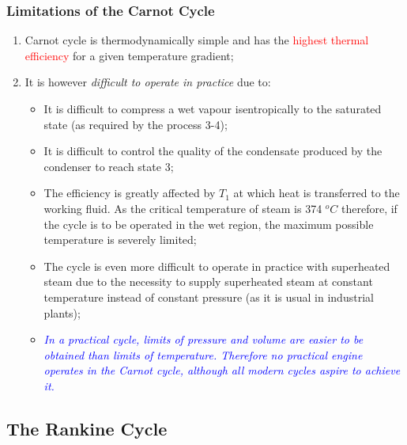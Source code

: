 \documentclass[10pt,compress,handout,ignorenonframetext]{beamer}
\begin{document}
\begin{frame}
 \frametitle{Limitations of the Carnot Cycle}
 \begin{enumerate}
  \item <1-> Carnot cycle is thermodynamically simple and has the \textcolor{red}{highest thermal efficiency} for a given temperature gradient;
  \item <2-> It is however {\it difficult to operate in practice} due to:
  \begin{itemize}
   \item <3-> It is difficult to compress a wet vapour isentropically to the saturated state (as required by the process 3-4);
   \item <4-> It is difficult to control the quality of the condensate produced by the condenser to reach state 3;
   \item <5-> The efficiency is greatly affected by $T_{1}$ at which heat is transferred to the working fluid. As the critical temperature of steam is 374 $^{o}C$ therefore, if the cycle is to be operated in the wet region, the maximum possible temperature is severely limited;
   \item <6-> The cycle is even more difficult to operate in practice with superheated steam due to the necessity to supply superheated steam at constant temperature instead of constant pressure (as it is usual in industrial plants);
   \item <7-> \textcolor{blue}{{\it In a practical cycle, limits of pressure and volume are easier to be obtained than limits of temperature. Therefore no practical engine operates in the Carnot cycle, although all modern cycles aspire to achieve it.}}
  \end{itemize}
 \end{enumerate}
 \normalsize
\end{frame}



\subsection{The Rankine Cycle}
\end{document}
